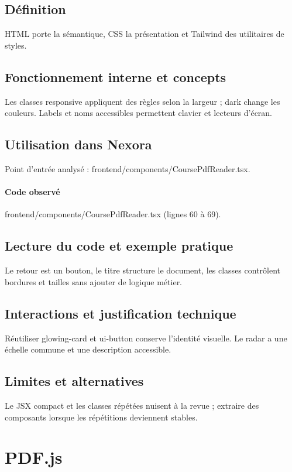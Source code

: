 \subsection*{Définition}
HTML porte la sémantique, CSS la présentation et Tailwind des utilitaires de styles.

\subsection*{Fonctionnement interne et concepts}
Les classes responsive appliquent des règles selon la largeur ; dark change les couleurs. Labels et noms accessibles permettent clavier et lecteurs d’écran.

\subsection*{Utilisation dans Nexora}
Point d’entrée analysé : frontend/components/CoursePdfReader.tsx.

\paragraph{Code observé} frontend/components/CoursePdfReader.tsx (lignes 60 à 69).

\subsection*{Lecture du code et exemple pratique}
Le retour est un bouton, le titre structure le document, les classes contrôlent bordures et tailles sans ajouter de logique métier.

\subsection*{Interactions et justification technique}
Réutiliser glowing-card et ui-button conserve l’identité visuelle. Le radar a une échelle commune et une description accessible.

\subsection*{Limites et alternatives}
Le JSX compact et les classes répétées nuisent à la revue ; extraire des composants lorsque les répétitions deviennent stables.

\section{PDF.js}
